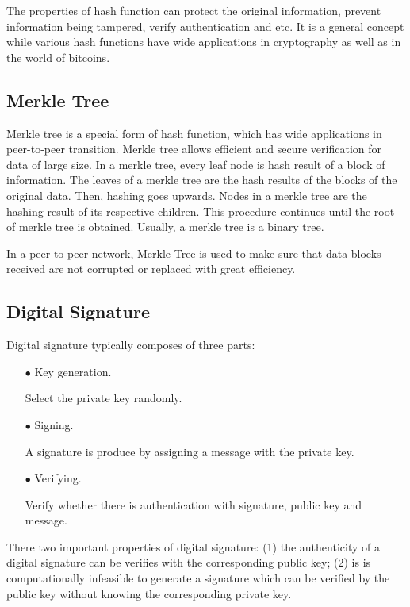 \documentclass[12pt,a4paper]{article}
\begin{document}
The properties of hash function can protect the original information, prevent information being tampered, verify authentication and etc. It is a general concept while various hash functions have wide applications in cryptography as well as in the world of bitcoins.

\subsection{Merkle Tree}

Merkle tree is a special form of hash function, which has wide applications in peer-to-peer transition. Merkle tree allows efficient and secure verification for data of large size. In a merkle tree, every leaf node is hash result of a block of information. The leaves of a merkle tree are the hash results of the blocks of the original data. Then, hashing goes upwards. Nodes in a merkle tree are the hashing result of its respective children. This procedure continues until the root of merkle tree is obtained. Usually, a merkle tree is a binary tree. 

In a peer-to-peer network, Merkle Tree is used to make sure that data blocks received are not corrupted or replaced with great efficiency.

\subsection{Digital Signature}

Digital signature typically composes of three parts:
\begin{enumerate}
    \item [$\bullet$] Key generation. 
    
    Select the private key randomly.
    
    \item [$\bullet$] Signing.
    
    A signature is produce by assigning a message with the private key.
    
    \item [$\bullet$] Verifying. 
    
    Verify whether there is authentication with signature, public key and message.
    
\end{enumerate}

There two important properties of digital signature: (1) the authenticity of a digital signature can be verifies with the corresponding public key; (2) is is computationally infeasible to generate a signature which can be verified by the public key without knowing the corresponding private key.
\end{document}
